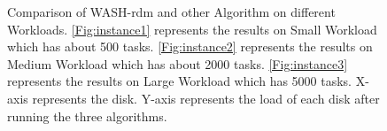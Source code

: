 \documentclass[conference]{IEEEtran}
\begin{document}
\begin{figure}[!t]
	\centering
	\quad\quad %
	\quad\quad
	\vspace{-1ex}
	\caption{Comparison of WASH-rdm and other Algorithm on different Workloads. \ref{Fig:instance1} represents the results on Small Workload which has about 500 tasks. \ref{Fig:instance2} represents the results on Medium Workload which has about 2000 tasks.
	\ref{Fig:instance3} represents the results on Large Workload which has 5000 tasks. X-axis represents the disk. Y-axis represents the load of each disk after running the three algorithms.}
	\label{Fig:instance}
	\vspace{-1ex}
\end{figure}
\end{document}
